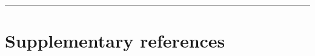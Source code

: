 \documentclass[
  bookmarksnumbered]{article}
\begin{document}
\begin{center}\rule{0.5\linewidth}{0.5pt}\end{center}

\section{Supplementary references}\label{refs}

\begin{multicols}{2}
\AtNextBibliography{\footnotesize}
\printbibliography[heading=none]
\normalsize
\end{multicols}

\def\printbibliography{}

\printbibliography
\end{document}
